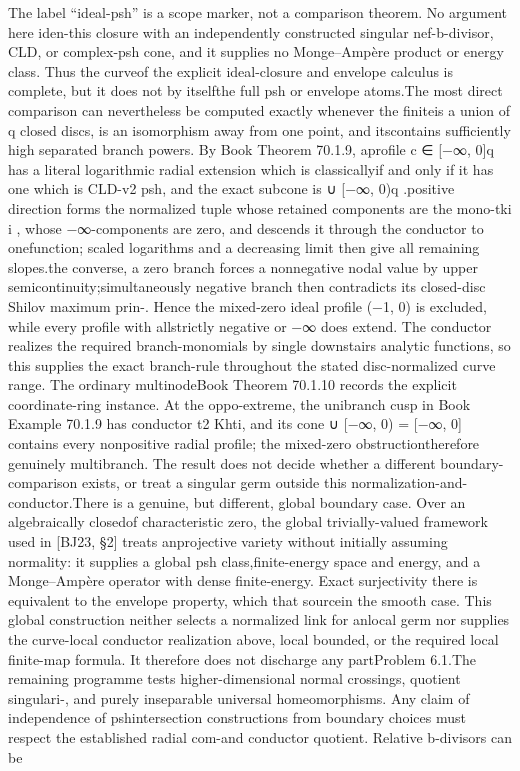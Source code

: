 \documentclass[11pt]{article}
\begin{document}
\begin{GrantData}
{   The label “ideal-psh” is a scope marker, not a comparison theorem. No argument here iden- this closure with an independently constructed singular nef-b-divisor, CLD, or complex-\nanalytic psh cone, and it supplies no Monge–Ampère product or energy class. Thus the curve\ncase of the explicit ideal-closure and envelope calculus is complete, but it does not by itself\ndischarge the full psh or envelope atoms.\n    The most direct comparison can nevertheless be computed exactly whenever the ﬁnite\nnormalization is a union of q closed discs, is an isomorphism away from one point, and its\nconductor contains suﬃciently high separated branch powers. By Book Theorem 70.1.9, a\nhomogeneous proﬁle c ∈ [−∞, 0]q has a literal logarithmic radial extension which is classically\npsh if and only if it has one which is CLD-v2 psh, and the exact subcone is ∪ [−∞, 0)q .\nThe positive direction forms the normalized tuple whose retained components are the mono-\nmials tki i , whose −∞-components are zero, and descends it through the conductor to one\nanalytic function; scaled logarithms and a decreasing limit then give all remaining slopes.\nFor the converse, a zero branch forces a nonnegative nodal value by upper semicontinuity;\nany simultaneously negative branch then contradicts its closed-disc Shilov maximum prin-\nciple. Hence the mixed-zero ideal proﬁle (−1, 0) is excluded, while every proﬁle with all\ncoordinates strictly negative or −∞ does extend. The conductor realizes the required branch-\nwise monomials by single downstairs analytic functions, so this supplies the exact branch-\ncompatibility rule throughout the stated disc-normalized curve range. The ordinary multinode\ntheorem Book Theorem 70.1.10 records the explicit coordinate-ring instance. At the oppo-\nsite extreme, the unibranch cusp in Book Example 70.1.9 has conductor t2 Khti, and its cone ∪ [−∞, 0) = [−∞, 0] contains every nonpositive radial proﬁle; the mixed-zero obstruction\nis therefore genuinely multibranch. The result does not decide whether a diﬀerent boundary-\ntrace comparison exists, or treat a singular germ outside this normalization-and-conductor\nrange.\n    There is a genuine, but diﬀerent, global boundary case. Over an algebraically closed of characteristic zero, the global trivially-valued framework used in [BJ23, §2] treats an\nintegral projective variety without initially assuming normality: it supplies a global psh class,\nits ﬁnite-energy space and energy, and a Monge–Ampère operator with dense ﬁnite-energy\nimage. Exact surjectivity there is equivalent to the envelope property, which that source\nrecords in the smooth case. This global construction neither selects a normalized link for an\nexcellent local germ nor supplies the curve-local conductor realization above, local bounded\nproducts, or the required local ﬁnite-map formula. It therefore does not discharge any part\nof Problem 6.1.\n    The remaining programme tests higher-dimensional normal crossings, quotient singulari-\nties, and purely inseparable universal homeomorphisms. Any claim of independence of psh\nor intersection constructions from boundary choices must respect the established radial com-\nparison and conductor quotient. Relative b-divisors can be }
\end{GrantData}
\end{document}
